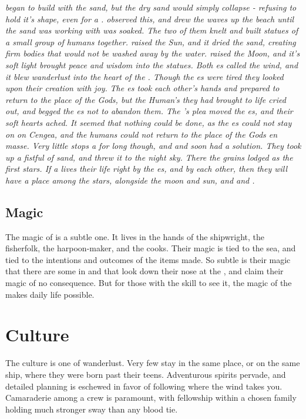 \documentclass[blue]{GL2020}
\begin{document}
\emph{\cFlow{} began to build with the sand, but the dry sand would simply collapse - refusing to hold it's shape, even for a \cFlow{\God}. \cEbb{} observed this, and drew the waves up the beach until the sand \cFlow{} was working with was soaked. The two of them knelt and built statues of a small group of humans together. \cFlow{} raised the Sun, and it dried the sand, creating firm bodies that would not be washed away by the water. \cEbb{} raised the Moon, and it's soft light brought peace and wisdom into the statues. Both \cEbb{\God}es called the wind, and it blew wanderlust into the heart of the \pShippies{}. Though the \cEbb{\God}es were tired they looked upon their creation with joy.}
\emph{The \cEbb{\God}es took each other's hands and prepared to return to the place of the Gods, but the Human's they had brought to life cried out, and begged the \cEbb{\God}es not to abandon them. The \pShippies{}'s plea moved the \cEbb{\God}es, and their soft hearts ached. It seemed that nothing could be done, as the \cEbb{\God}es could not stay on on Cengea, and the humans could not return to the place of the Gods en masse. Very little stops a \cEbb{\God} for long though, and \cEbb{} and \cFlow{} soon had a solution. They took up a fistful of sand, and threw it to the night sky. There the grains lodged as the first stars. If a \pShippies{} lives their life right by the \cEbb{\God}es, and by each other, then they will have a place among the stars, alongside the moon and sun, and \cEbb{} and \cFlow{}.}

\subsection*{Magic}
The magic of \pShip{} is a subtle one. It lives in the hands of the shipwright, the fisherfolk, the harpoon-maker, and the cooks. Their magic is tied to the sea, and tied to the intentions and outcomes of the items made. So subtle is their magic that there are some in \pFarm{} and \pTech{} that look down their nose at the \pShippies{}, and claim their magic of no consequence. But for those with the skill to see it, the magic of the \pShippies{} makes daily life possible.

\section*{Culture}
The \pShip{} culture is one of wanderlust. Very few \pShippies{} stay in the same place, or on the same ship, where they were born past their teens. Adventurous spirits pervade, and detailed planning is eschewed in favor of following where the wind takes you. Camaraderie among a crew is paramount, with fellowship within a chosen family holding much stronger sway than any blood tie.
\end{document}
